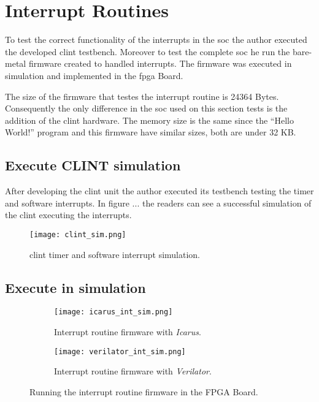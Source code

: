 \section{Interrupt Routines}
To test the correct functionality of the interrupts in the \acrshort{soc} the author executed the developed \acrshort{clint} testbench. Moreover to test the complete \acrshort{soc} he run the bare-metal firmware created to handled interrupts. The firmware was executed in simulation and implemented in the \acrshort{fpga} Board.

The size of the firmware that testes the interrupt routine is 24364 Bytes. Consequently the only difference in the \acrshort{soc} used on this section tests is the addition of the \acrshort{clint} hardware. The memory size is the same since the \enquote{Hello World!} program and this firmware have similar sizes, both are under 32 KB.

\subsection{Execute CLINT simulation}
After developing the \acrshort{clint} unit the author executed its testbench testing the timer and software interrupts. In figure ... the readers can see a successful simulation of the \acrshort{clint} executing the interrupts.

\begin{figure}[!ht]
    \centering
    \texttt{[image: clint\_sim.png]}
    \caption{\acrshort{clint} timer and software interrupt simulation.}
    \label{fig:clint_sim}
\end{figure}

\subsection{Execute in simulation}
\begin{figure}[!ht]
    \centering
    \begin{subfigure}[b]{0.49\textwidth}
        \centering
        \texttt{[image: icarus\_int\_sim.png]}
        \caption{Interrupt routine firmware with \textit{Icarus}.}
        \label{fig:icarus_int_sim}
    \end{subfigure}
    \hfill
    \begin{subfigure}[b]{0.49\textwidth}
        \centering
        \texttt{[image: verilator\_int\_sim.png]}
        \caption{Interrupt routine firmware with \textit{Verilator}.}
        \label{fig:verilator_int_sim}
    \end{subfigure}
    \caption{Running the interrupt routine firmware in the FPGA Board.}
    \label{fig:int_sim}
\end{figure}

